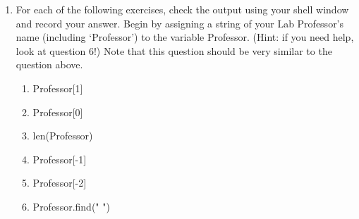 \documentclass[11pt, letterpaper, onecolumn, oneside, final]{article}
\begin{document}
\begin{enumerate}
\item
For each of the following exercises, check the output using your shell window and record your answer. Begin by assigning a string of your Lab Professor's name (including `Professor') to the variable {\consolas Professor}. (Hint: if you need help, look at question 6!) Note that this question should be very similar to the question above.
\begin{enumerate}
    \item {\consolas Professor[1]}\\
    \item {\consolas Professor[0]}\\
    \item {\consolas len(Professor)}\\
    \item {\consolas Professor[-1]}\\
    \item {\consolas Professor[-2]}\\
    \item {\consolas Professor.find(" ")}\\
    

\end{enumerate}
\end{enumerate}
\end{document}
